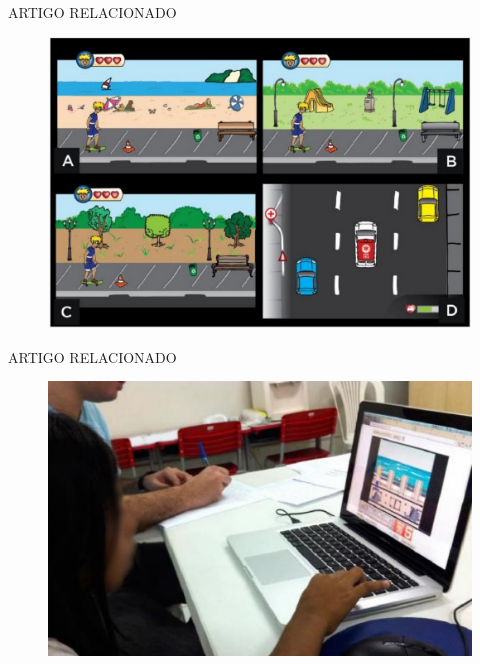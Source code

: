 \documentclass{Alexandre}
\begin{document}
\begin{frame}{ARTIGO RELACIONADO}

    \begin{figure}
        \includegraphics[scale = 0.3]{Figuras/Esquadrao192.jpg}
    \end{figure}

\end{frame}


\begin{frame}{ARTIGO RELACIONADO}
    
    \begin{figure}
        \includegraphics[scale = 0.3]{Figuras/crianca192.jpg}
    \end{figure}

\end{frame}
\end{document}
